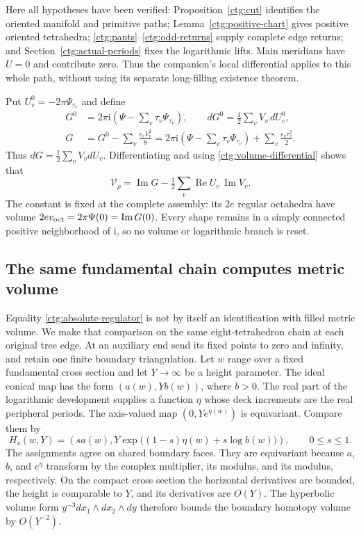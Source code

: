 \documentclass[11pt]{article}
\numberwithin{equation}{section}
\theoremstyle{definition}
\theoremstyle{remark}
\newcommand{\ii}{\mathrm i}
\newcommand{\Rea}{\operatorname{Re}}
\newcommand{\Ima}{\operatorname{Im}}
\begin{document}
Here all hypotheses have been verified: Proposition~\ref{ctg:cut}
identifies the oriented manifold and primitive paths;
Lemma~\ref{ctg:positive-chart} gives positive oriented tetrahedra;
\eqref{ctg:pants}--\eqref{ctg:odd-returns} supply complete edge
returns; and Section~\ref{ctg:actual-periods} fixes the logarithmic
lifts. Main meridians have $U=0$ and contribute zero. Thus the
companion's local differential applies to this whole path, without
using its separate long-filling existence theorem.

Put $U_v^0=-2\pi\Psi_{\tau_v}$ and define
\begin{equation}\label{ctg:G}
\begin{split}
 G^0&=2\pi\ii\left(\Psi-\sum_v\tau_v\Psi_{\tau_v}\right),\qquad
 dG^0=\tfrac12\sum_vV_v\,dU_v^0,\\
 G&=G^0-\sum_v\frac{\epsilon_vV_v^2}{8}
   =2\pi\ii\left(\Psi-\sum_v\tau_v\Psi_{\tau_v}\right)
                          +\sum_v\frac{\epsilon_v\tau_v^2}{2}.
\end{split}
\end{equation}
Thus $dG=\tfrac12\sum_vV_vdU_v$. Differentiating and using
\eqref{ctg:volume-differential} shows that
\begin{equation}\label{ctg:absolute-regulator}
 \mathcal V_\rho=\Ima G-\tfrac12\sum_v\Rea U_v\,\Ima V_v.
\end{equation}
The constant is fixed at the complete assembly: its $2e$ regular
octahedra have volume $2e v_{\rm oct}=2\pi\Psi(0)=\Ima G(0)$.
Every shape remains in a simply connected positive neighborhood of
$\ii$, so no volume or logarithmic branch is reset.

\subsection{The same fundamental chain computes metric volume}
Equality \eqref{ctg:absolute-regulator} is not by itself an
identification with filled metric volume. We make that comparison on
the same eight-tetrahedron chain at each original tree edge.
At an auxiliary end send its fixed points to zero and infinity, and
retain one finite boundary triangulation. Let $w$ range over a fixed
fundamental cross section and let $Y\to\infty$ be a height parameter.
The ideal conical map has the form $(a(w),Yb(w))$, where $b>0$.
The real part of the logarithmic development supplies a function $\eta$ whose deck
increments are the real peripheral periods. The axis-valued map
$(0,Ye^{\eta(w)})$ is equivariant. Compare them by
\begin{equation}\label{ctg:homotopy}
 H_s(w,Y)=\left(sa(w),Y\exp\bigl((1-s)\eta(w)+s\log b(w)\bigr)\right),
 \qquad 0\le s\le1.
\end{equation}
The assignments agree on shared boundary faces. They are equivariant
because $a$, $b$, and $e^\eta$ transform by the complex multiplier,
its modulus, and its modulus, respectively. On the compact cross
section the horizontal derivatives are bounded, the height is
comparable to $Y$, and its derivatives are $O(Y)$. The hyperbolic
volume form $y^{-3}dx_1\wedge dx_2\wedge dy$ therefore bounds the
boundary homotopy volume by $O(Y^{-2})$.
\end{document}
